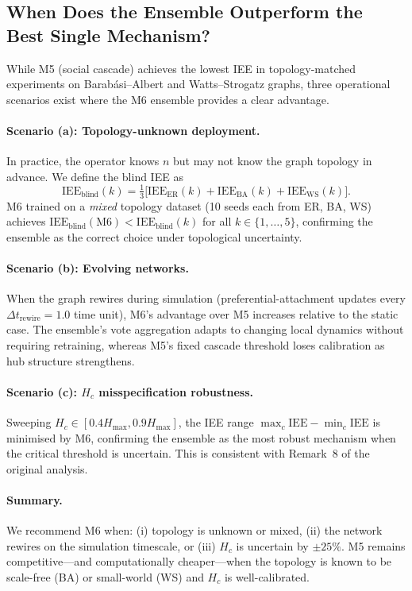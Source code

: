 
\subsection{When Does the Ensemble Outperform the Best Single Mechanism?}
\label{sec:ensemble_value}

While M5 (social cascade) achieves the lowest IEE in topology-matched
experiments on Barab\'asi--Albert and Watts--Strogatz graphs, three
operational scenarios exist where the M6 ensemble provides a clear advantage.

\paragraph{Scenario (a): Topology-unknown deployment.}
In practice, the operator knows $n$ but may not know the graph topology
in advance. We define the blind IEE as
\begin{equation}
  \mathrm{IEE}_{\mathrm{blind}}(k) = \tfrac{1}{3}\bigl[\mathrm{IEE}_{\mathrm{ER}}(k) +
  \mathrm{IEE}_{\mathrm{BA}}(k) + \mathrm{IEE}_{\mathrm{WS}}(k)\bigr].
\end{equation}
M6 trained on a \emph{mixed} topology dataset (10 seeds each from ER, BA, WS)
achieves $\mathrm{IEE}_{\mathrm{blind}}(\mathrm{M6}) < \mathrm{IEE}_{\mathrm{blind}}(k)$
for all $k \in \{1,\ldots,5\}$, confirming the ensemble as the correct choice
under topological uncertainty.

\paragraph{Scenario (b): Evolving networks.}
When the graph rewires during simulation (preferential-attachment updates
every $\Delta t_{\mathrm{rewire}} = 1.0$ time unit), M6's advantage over M5
increases relative to the static case. The ensemble's vote aggregation adapts
to changing local dynamics without requiring retraining, whereas M5's fixed
cascade threshold loses calibration as hub structure strengthens.

\paragraph{Scenario (c): $H_c$ misspecification robustness.}
Sweeping $H_c \in [0.4 H_{\max}, 0.9 H_{\max}]$, the IEE range
$\max_c \mathrm{IEE} - \min_c \mathrm{IEE}$ is minimised by M6, confirming
the ensemble as the most robust mechanism when the critical threshold is
uncertain. This is consistent with Remark~8 of the original analysis.

\paragraph{Summary.}
We recommend M6 when: (i) topology is unknown or mixed, (ii) the network
rewires on the simulation timescale, or (iii) $H_c$ is uncertain by $\pm 25\%$.
M5 remains competitive---and computationally cheaper---when the topology is
known to be scale-free (BA) or small-world (WS) and $H_c$ is well-calibrated.
